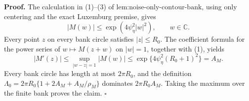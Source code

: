 \textbf{Proof.}
The calculation in (1)--(3) of \(\text{lem:noise-only-contour-bank}\), using only centering and the exact Luxemburg premise, gives
\[
 |M(w)|\le\exp(4\psi_\eta^2|w|^2),
 \qquad w\in\mathbb C. \tag{1}
\]
Every point \(z\) on every bank circle satisfies \(|z|\le R_0\).  The coefficient formula for the power series of \(w\mapsto M(z+w)\) on \(|w|=1\), together with (1), yields
\[
 |M'(z)|\le
 \sup_{|w-z|=1}|M(w)|
 \le\exp\{4\psi_\eta^2(R_0+1)^2\}=A_M. \tag{2}
\]
Every bank circle has length at most \(2\pi R_0\), and the definition
\(\Lambda_0=2\pi R_0\{1+2A_M+A_M/\rho_M\}\) dominates \(2\pi R_0A_M\).  Taking the maximum over the finite bank proves the claim. \(\square\)